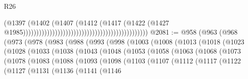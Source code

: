 \begin{lexlean}{R26}
\begin{coremodule}
                                                                                    (@1397
                                                                                      (@1402
                                                                                        (@1407
                                                                                          (@1412
                                                                                            (@1417
                                                                                              (@1422
                                                                                                (@1427
                                                                                                  @1985)))))))))))))))))))))))))))))))))))))))))))))))
@2081 := @958
    (@963
      (@968
        (@973
          (@978
            (@983
              (@988
                (@993
                  (@998
                    (@1003
                      (@1008
                        (@1013
                          (@1018
                            (@1023
                              (@1028
                                (@1033
                                  (@1038
                                    (@1043
                                      (@1048
                                        (@1053
                                          (@1058
                                            (@1063
                                              (@1068
                                                (@1073
                                                  (@1078
                                                    (@1083
                                                      (@1088
                                                        (@1093
                                                          (@1098
                                                            (@1103
                                                              (@1107
                                                                (@1112
                                                                  (@1117
                                                                    (@1122
                                                                      (@1127
                                                                        (@1131
                                                                          (@1136
                                                                            (@1141
                                                                              (@1146

\end{coremodule}
\end{lexlean}
